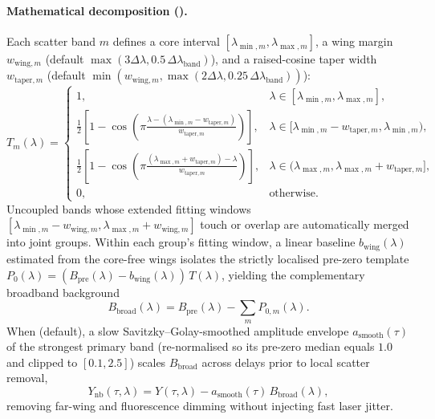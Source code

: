 \paragraph{Mathematical decomposition ().}
Each scatter band $m$ defines a core interval $[\lambda_{\min,m}, \lambda_{\max,m}]$,
a wing margin $w_{\mathrm{wing},m}$ (default $\max(3\Delta\lambda, 0.5\,\Delta\lambda_{\mathrm{band}})$),
and a raised-cosine taper width $w_{\mathrm{taper},m}$ (default
$\min(w_{\mathrm{wing},m}, \max(2\Delta\lambda, 0.25\,\Delta\lambda_{\mathrm{band}}))$):
\begin{equation}
  T_m(\lambda) =
  \begin{cases}
    1, & \lambda \in [\lambda_{\min,m}, \lambda_{\max,m}], \\
    \frac{1}{2}\left[1 - \cos\!\left(\pi\frac{\lambda - (\lambda_{\min,m} - w_{\mathrm{taper},m})}{w_{\mathrm{taper},m}}\right)\right], & \lambda \in [\lambda_{\min,m} - w_{\mathrm{taper},m}, \lambda_{\min,m}), \\
    \frac{1}{2}\left[1 - \cos\!\left(\pi\frac{(\lambda_{\max,m} + w_{\mathrm{taper},m}) - \lambda}{w_{\mathrm{taper},m}}\right)\right], & \lambda \in (\lambda_{\max,m}, \lambda_{\max,m} + w_{\mathrm{taper},m}], \\
    0, & \text{otherwise.}
  \end{cases}
\end{equation}
Uncoupled bands whose extended fitting windows
$[\lambda_{\min,m} - w_{\mathrm{wing},m}, \lambda_{\max,m} + w_{\mathrm{wing},m}]$
touch or overlap are automatically merged into joint groups. Within each group's
fitting window, a linear baseline $b_{\mathrm{wing}}(\lambda)$ estimated from the
core-free wings isolates the strictly localised pre-zero template
$P_0(\lambda) = (B_{\mathrm{pre}}(\lambda) - b_{\mathrm{wing}}(\lambda))\,T(\lambda)$,
yielding the complementary broadband background
\begin{equation}
  B_{\mathrm{broad}}(\lambda) = B_{\mathrm{pre}}(\lambda) - \sum_{m} P_{0,m}(\lambda).
\end{equation}
When  (default), a slow Savitzky--Golay-smoothed
amplitude envelope $a_{\mathrm{smooth}}(\tau)$ of the strongest primary band
(re-normalised so its pre-zero median equals $1.0$ and clipped to $[0.1, 2.5]$)
scales $B_{\mathrm{broad}}$ across delays prior to local scatter removal,
\begin{equation}
  Y_{\mathrm{nb}}(\tau, \lambda) = Y(\tau, \lambda) - a_{\mathrm{smooth}}(\tau)\, B_{\mathrm{broad}}(\lambda),
\end{equation}
removing far-wing and fluorescence dimming without injecting fast laser jitter.

